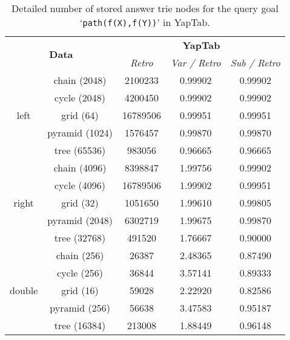 \begin{table}[ht]
\centering
\small{
  \begin{tabular}{cc|ccc}
   \hline
    \hline
    \multicolumn{2}{c|}{\multirow{2}{*}{\normalsize{\textbf{Data}}}} & \multicolumn{3}{c}{\normalsize{\textbf{YapTab}}} \\
     \multicolumn{2}{c|}{} & \small{\textit{Retro}} & \textit{\small{Var / Retro}} & \textit{\small{Sub / Retro}} \\
   \hline
   \hline
   \multirow{5}{*}{left} &  \footnotesize{chain (2048)} &  2100233 &  0.99902 & 0.99902 \\
   &  \footnotesize{cycle (2048)} &  4200450 &  0.99902 & 0.99902 \\
   &  \footnotesize{grid (64)} &  16789506 &  0.99951 & 0.99951 \\
   &  \footnotesize{pyramid (1024)} &  1576457 &  0.99870 & 0.99870 \\
   &  \footnotesize{tree (65536)} &  983056 &  0.96665 & 0.96665 \\
   \hline
   
   \multirow{5}{*}{right} &  \footnotesize{chain (4096)} &  8398847 &  1.99756 & 0.99902 \\
   &  \footnotesize{cycle (4096)} &  16789506 &  1.99902 & 0.99951 \\
   &  \footnotesize{grid (32)} &  1051650 &  1.99610 & 0.99805 \\
   &  \footnotesize{pyramid (2048)} &  6302719 &  1.99675 & 0.99870 \\
   &  \footnotesize{tree (32768)} &  491520 &  1.76667 & 0.90000 \\
   \hline
   
   \multirow{5}{*}{double} &  \footnotesize{chain (256)} &  26387 &  2.48365 & 0.87490 \\
   &  \footnotesize{cycle (256)} &  36844 &  3.57141 & 0.89333 \\
   &  \footnotesize{grid (16)} &  59028 &  2.22920 & 0.82586 \\
   &  \footnotesize{pyramid (256)} &  56638 &  3.47583 & 0.95187 \\
   &  \footnotesize{tree (16384)} &  213008 &  1.88449 & 0.96148 \\
   \hline
\hline
\end{tabular}
}
\caption{Detailed number of stored answer trie nodes for the query goal `\texttt{path(f(X),f(Y))}' in YapTab.}
\label{tbl:results_detail_stst_space}
\end{table}
